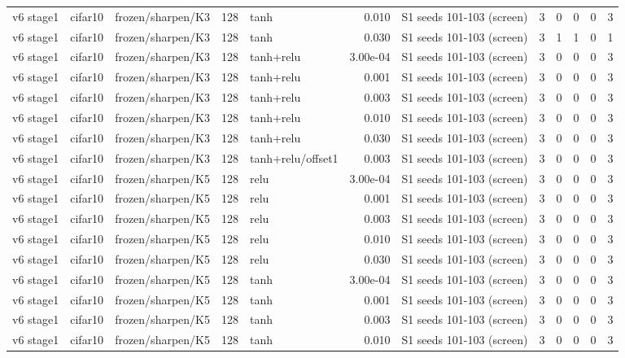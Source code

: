 \begin{table}[htbp]
{\begin{tabular}{@{}lllrlrlrrrrr@{}}
v6 stage1 & cifar10 & frozen/sharpen/K3 & 128 & tanh & 0.010 & S1 seeds 101-103 (screen) & 3 & 0 & 0 & 0 & 3 \\
v6 stage1 & cifar10 & frozen/sharpen/K3 & 128 & tanh & 0.030 & S1 seeds 101-103 (screen) & 3 & 1 & 1 & 0 & 1 \\
v6 stage1 & cifar10 & frozen/sharpen/K3 & 128 & tanh+relu & 3.00e-04 & S1 seeds 101-103 (screen) & 3 & 0 & 0 & 0 & 3 \\
v6 stage1 & cifar10 & frozen/sharpen/K3 & 128 & tanh+relu & 0.001 & S1 seeds 101-103 (screen) & 3 & 0 & 0 & 0 & 3 \\
v6 stage1 & cifar10 & frozen/sharpen/K3 & 128 & tanh+relu & 0.003 & S1 seeds 101-103 (screen) & 3 & 0 & 0 & 0 & 3 \\
v6 stage1 & cifar10 & frozen/sharpen/K3 & 128 & tanh+relu & 0.010 & S1 seeds 101-103 (screen) & 3 & 0 & 0 & 0 & 3 \\
v6 stage1 & cifar10 & frozen/sharpen/K3 & 128 & tanh+relu & 0.030 & S1 seeds 101-103 (screen) & 3 & 0 & 0 & 0 & 3 \\
v6 stage1 & cifar10 & frozen/sharpen/K3 & 128 & tanh+relu/offset1 & 0.003 & S1 seeds 101-103 (screen) & 3 & 0 & 0 & 0 & 3 \\
v6 stage1 & cifar10 & frozen/sharpen/K5 & 128 & relu & 3.00e-04 & S1 seeds 101-103 (screen) & 3 & 0 & 0 & 0 & 3 \\
v6 stage1 & cifar10 & frozen/sharpen/K5 & 128 & relu & 0.001 & S1 seeds 101-103 (screen) & 3 & 0 & 0 & 0 & 3 \\
v6 stage1 & cifar10 & frozen/sharpen/K5 & 128 & relu & 0.003 & S1 seeds 101-103 (screen) & 3 & 0 & 0 & 0 & 3 \\
v6 stage1 & cifar10 & frozen/sharpen/K5 & 128 & relu & 0.010 & S1 seeds 101-103 (screen) & 3 & 0 & 0 & 0 & 3 \\
v6 stage1 & cifar10 & frozen/sharpen/K5 & 128 & relu & 0.030 & S1 seeds 101-103 (screen) & 3 & 0 & 0 & 0 & 3 \\
v6 stage1 & cifar10 & frozen/sharpen/K5 & 128 & tanh & 3.00e-04 & S1 seeds 101-103 (screen) & 3 & 0 & 0 & 0 & 3 \\
v6 stage1 & cifar10 & frozen/sharpen/K5 & 128 & tanh & 0.001 & S1 seeds 101-103 (screen) & 3 & 0 & 0 & 0 & 3 \\
v6 stage1 & cifar10 & frozen/sharpen/K5 & 128 & tanh & 0.003 & S1 seeds 101-103 (screen) & 3 & 0 & 0 & 0 & 3 \\
v6 stage1 & cifar10 & frozen/sharpen/K5 & 128 & tanh & 0.010 & S1 seeds 101-103 (screen) & 3 & 0 & 0 & 0 & 3 \\

\end{tabular}}
\end{table}
